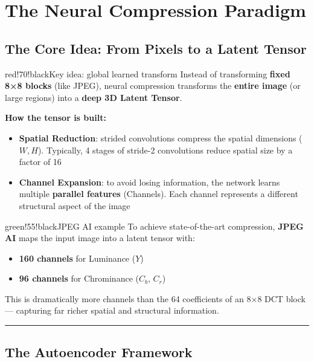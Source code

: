 \section{The Neural Compression Paradigm}

\subsection{The Core Idea: From Pixels to a Latent Tensor}

\begin{calloutbox}{red!70!black}{Key idea: global learned transform}
Instead of transforming \textbf{fixed 8×8 blocks} (like JPEG), neural compression transforms the \textbf{entire image} (or large regions) into a \textbf{deep 3D Latent Tensor}.
\end{calloutbox}

\textbf{How the tensor is built:}

\begin{itemize}
\item \textbf{Spatial Reduction}: strided convolutions compress the spatial dimensions ($W, H$). Typically, 4 stages of stride-2 convolutions reduce spatial size by a factor of 16
\item \textbf{Channel Expansion}: to avoid losing information, the network learns multiple \textbf{parallel features} (Channels). Each channel represents a different structural aspect of the image
\end{itemize}

\begin{calloutbox}{green!55!black}{JPEG AI example}
To achieve state-of-the-art compression, \textbf{JPEG AI} maps the input image into a latent tensor with:
\begin{itemize}
\item \textbf{160 channels} for Luminance ($Y$)
\item \textbf{96 channels} for Chrominance ($C_b$, $C_r$)
\end{itemize}

This is dramatically more channels than the 64 coefficients of an 8×8 DCT block — capturing far richer spatial and structural information.
\end{calloutbox}

\bigskip\hrule\bigskip

\subsection{The Autoencoder Framework}

